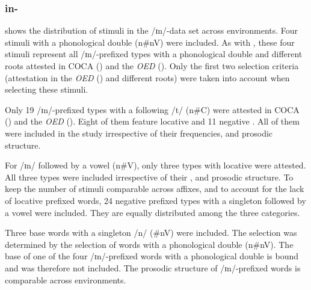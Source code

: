 \subsubsection{in-}

 shows the distribution of  stimuli in the /ɪn/-data set across environments. 
Four stimuli with a phonological double ({n\#nV}) were included. As with , these four stimuli represent all /ɪn/-prefixed types with a phonological double and different roots attested in  {COCA} (\citealt{Davies.20082014}) and the \textit{OED} (\citealt{OED.2013}). Only the first two selection criteria (attestation in the \textit{OED} (\citealt{OED.2013}) and different roots) were taken into account when selecting these stimuli. 



Only 19 /ɪn/-prefixed types with a following /t/ ({n\#C}) were attested  in  {COCA} (\citealt{Davies.20082014}) and the \textit{OED} (\citealt{OED.2013}).  Eight of them feature locative  and 11 negative . All of them were included in the study irrespective of their frequencies,  and prosodic structure. 

For /ɪn/ followed by a vowel ({n\#V}), only three types with locative  were attested. All three types were included irrespective of their ,  and prosodic structure. 
To keep the number of stimuli comparable across affixes, and to account for the lack of locative prefixed words, 24 negative prefixed types with a singleton followed by a vowel were included. They are equally distributed among the three  categories.  



Three base words with a singleton /n/ ({\#nV}) were included. The selection was determined by the selection of words with a phonological double ({n\#nV}). The base of one of the four /ɪn/-prefixed words with a phonological double is bound and was therefore not included. 
The prosodic structure of /ɪn/-prefixed words is comparable across environments.


